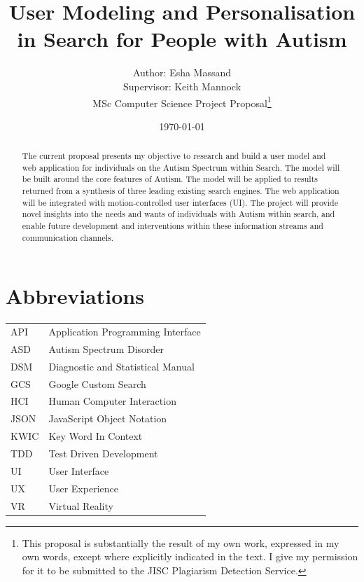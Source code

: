 \documentclass[a4paper, 11pt]{article}
\begin{document}
\begin{titlepage}

\title{User Modeling and Personalisation in Search for People with Autism}
\author{Author: Esha Massand\\Supervisor: Keith Mannock\\
MSc Computer Science Project Proposal\footnote{This proposal is substantially the result of my own work, expressed in my own words, except where explicitly indicated in the text. I give my permission for it to be submitted to the JISC Plagiarism Detection Service. }}
\date{\today}
\maketitle


\begin{abstract}
The current proposal presents my objective to research and build a user model and web application for individuals on the Autism Spectrum within Search. The model will be built around the core features of Autism. The model will be applied to results returned from a synthesis of three leading existing search engines. The web application will be integrated with motion-controlled user interfaces (UI). The project will provide novel insights into the needs and wants of individuals with Autism within search, and enable future development and interventions within these information streams and communication channels.
\end{abstract}
\end{titlepage}
\clearpage


\section{Abbreviations}
\begin{tabular}{l l }
API & Application Programming Interface\\
ASD & Autism Spectrum Disorder\\
DSM & Diagnostic and Statistical Manual\\
GCS & Google Custom Search\\
HCI & Human Computer Interaction\\
JSON & JavaScript Object Notation\\
KWIC & Key Word In Context\\
TDD & Test Driven Development\\
UI & User Interface\\
UX & User Experience\\
VR & Virtual Reality\\
\end{tabular}
\clearpage
\end{document}
